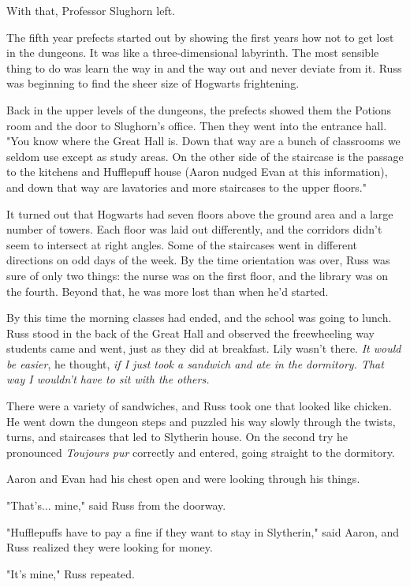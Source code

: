 \documentclass[a4paper,11pt]{article}
\begin{document}
With that, Professor Slughorn left.

The fifth year prefects started out by showing the first years how not to get lost in the dungeons. It was like a three-dimensional labyrinth. The most sensible thing to do was learn the way in and the way out and never deviate from it. Russ was beginning to find the sheer size of Hogwarts frightening.

Back in the upper levels of the dungeons, the prefects showed them the Potions room and the door to Slughorn's office. Then they went into the entrance hall. "You know where the Great Hall is. Down that way are a bunch of classrooms we seldom use except as study areas. On the other side of the staircase is the passage to the kitchens and Hufflepuff house (Aaron nudged Evan at this information), and down that way are lavatories and more staircases to the upper floors."

It turned out that Hogwarts had seven floors above the ground area and a large number of towers. Each floor was laid out differently, and the corridors didn't seem to intersect at right angles. Some of the staircases went in different directions on odd days of the week. By the time orientation was over, Russ was sure of only two things: the nurse was on the first floor, and the library was on the fourth. Beyond that, he was more lost than when he'd started.

By this time the morning classes had ended, and the school was going to lunch. Russ stood in the back of the Great Hall and observed the freewheeling way students came and went, just as they did at breakfast. Lily wasn't there. \emph{It would be easier}, he thought, \emph{if I just took a sandwich and ate in the dormitory. That way I wouldn't have to sit with the others.}

There were a variety of sandwiches, and Russ took one that looked like chicken. He went down the dungeon steps and puzzled his way slowly through the twists, turns, and staircases that led to Slytherin house. On the second try he pronounced \emph{Toujours pur} correctly and entered, going straight to the dormitory.

Aaron and Evan had his chest open and were looking through his things.

"That's... mine," said Russ from the doorway.

"Hufflepuffs have to pay a fine if they want to stay in Slytherin," said Aaron, and Russ realized they were looking for money.

"It's mine," Russ repeated.
\end{document}
